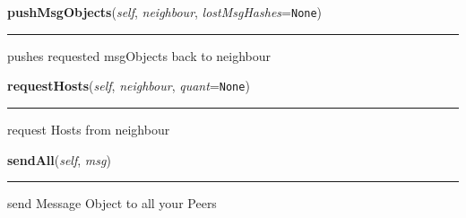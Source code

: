     \label{peer:Peer:pushMsgObjects}

    \vspace{0.5ex}

\hspace{.8\funcindent}\begin{boxedminipage}{\funcwidth}

    \raggedright \textbf{pushMsgObjects}(\textit{self}, \textit{neighbour}, \textit{lostMsgHashes}={\tt None})

    \vspace{-1.5ex}

    \rule{\textwidth}{0.5\fboxrule}
\setlength{\parskip}{2ex}
    pushes requested msgObjects back to neighbour

\setlength{\parskip}{1ex}
    \end{boxedminipage}

    \label{peer:Peer:requestHosts}

    \vspace{0.5ex}

\hspace{.8\funcindent}\begin{boxedminipage}{\funcwidth}

    \raggedright \textbf{requestHosts}(\textit{self}, \textit{neighbour}, \textit{quant}={\tt None})

    \vspace{-1.5ex}

    \rule{\textwidth}{0.5\fboxrule}
\setlength{\parskip}{2ex}
    request Hosts from neighbour

\setlength{\parskip}{1ex}
    \end{boxedminipage}

    \label{peer:Peer:sendAll}

    \vspace{0.5ex}

\hspace{.8\funcindent}\begin{boxedminipage}{\funcwidth}

    \raggedright \textbf{sendAll}(\textit{self}, \textit{msg})

    \vspace{-1.5ex}

    \rule{\textwidth}{0.5\fboxrule}
\setlength{\parskip}{2ex}
    send Message Object to all your Peers

\setlength{\parskip}{1ex}
    \end{boxedminipage}

